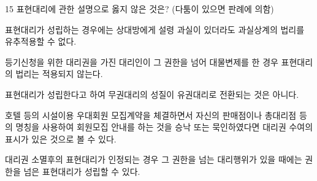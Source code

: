 \begin{question}{15}
표현대리에 관한 설명으로 옳지 않은 것은? (다툼이 있으면 판례에 의함)
\begin{choices}
  \item 표현대리가 성립하는 경우에는 상대방에게 설령 과실이 있더라도 과실상계의 법리를 유추적용할 수 없다.
  \item 등기신청을 위한 대리권을 가진 대리인이 그 권한을 넘어 대물변제를 한 경우 표현대리의 법리는 적용되지 않는다.
  \item 표현대리가 성립한다고 하여 무권대리의 성질이 유권대리로 전환되는 것은 아니다.
  \item 호텔 등의 시설이용 우대회원 모집계약을 체결하면서 자신의 판매점이나 총대리점 등의 명칭을 사용하여 회원모집 안내를 하는 것을 승낙 또는 묵인하였다면 대리권 수여의 표시가 있은 것으로 볼 수 있다.
  \item 대리권 소멸후의 표현대리가 인정되는 경우 그 권한을 넘는 대리행위가 있을 때에는 권한을 넘은 표현대리가 성립할 수 있다.
\end{choices}
\end{question}
